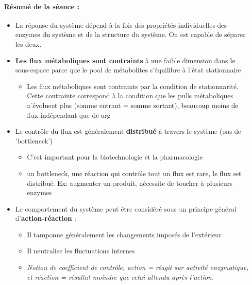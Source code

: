 \paragraph{Résumé de la séance :}
\begin{itemize}
	\item La réponse du système dépend à la fois des propriétés individuelles des enzymes du système et de la structure du système. On est capable de séparer les deux.
	

	\item \textbf{Les flux métaboliques sont contraints} à une faible dimension dans le sous-espace parce que le pool de métabolites  s'équilibre à l'état stationnaire
	\begin{itemize}
		\item Les flux métaboliques sont contraints par la condition de stationnarité. Cette contrainte correspond à la condition que les pulls métaboliques n'évoluent plus (somme entrant = somme sortant), beaucoup moins de flux indépendant que de arg
	\end{itemize}
	
	
	\item Le contrôle du flux est généralement \textbf{distribué} à travers le système (pas de 'bottleneck')
	\begin{itemize}
		\item C'est important pour la biotechnologie et la pharmacologie
		\item un bottleneck, une réaction qui contrôle tout un flux est rare, le flux est distribué.  Ex: augmenter un produit, nécessite de toucher à plusieurs enzymes
	\end{itemize}

	\item Le comportement du système peut être considéré sous un principe général d'\textbf{action-réaction} :
	\begin{itemize}
		\item Il tamponne généralement les changements imposés de l'extérieur
		\item Il neutralise les fluctuations internes
		\item \textit{Notion de coefficient de contrôle, action = réagit sur activité enzymatique, et réaction = résultat moindre que celui attendu après l'action.}
	\end{itemize}
\end{itemize}

